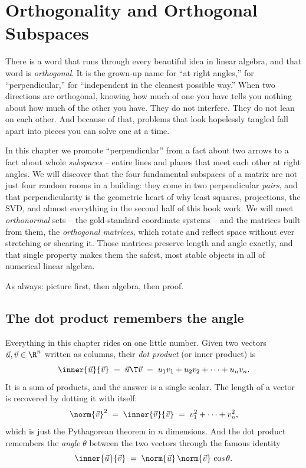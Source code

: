 \chapter{Orthogonality and Orthogonal Subspaces}

There is a word that runs through every beautiful idea in linear algebra, and that word is
\emph{orthogonal}. It is the grown-up name for ``at right angles,'' for ``perpendicular,'' for
``independent in the cleanest possible way.'' When two directions are orthogonal, knowing how
much of one you have tells you nothing about how much of the other you have. They do not
interfere. They do not lean on each other. And because of that, problems that look hopelessly
tangled fall apart into pieces you can solve one at a time.

In this chapter we promote ``perpendicular'' from a fact about two arrows to a fact about whole
\emph{subspaces} -- entire lines and planes that meet each other at right angles. We will discover
that the four fundamental subspaces of a matrix are not just four random rooms in a building:
they come in two perpendicular \emph{pairs}, and that perpendicularity is the geometric heart of
why least squares, projections, the SVD, and almost everything in the second half of this book
work. We will meet \emph{orthonormal} sets -- the gold-standard coordinate systems -- and the
matrices built from them, the \emph{orthogonal matrices}, which rotate and reflect space without
ever stretching or shearing it. Those matrices preserve length and angle exactly, and that single
property makes them the safest, most stable objects in all of numerical linear algebra.

As always: picture first, then algebra, then proof.

\section{The dot product remembers the angle}

Everything in this chapter rides on one little number. Given two vectors
$\vec{u},\vec{v}\in\R^n$ written as columns, their \emph{dot product} (or inner product) is
\[
  \inner{\vec{u}}{\vec{v}} \;=\; \vec{u}\T\vec{v}
  \;=\; u_1 v_1 + u_2 v_2 + \cdots + u_n v_n.
\]
It is a sum of products, and the answer is a single scalar. The length of a vector is recovered
by dotting it with itself:
\[
  \norm{\vec{v}}^2 \;=\; \inner{\vec{v}}{\vec{v}} \;=\; v_1^2 + \cdots + v_n^2,
\]
which is just the Pythagorean theorem in $n$ dimensions. And the dot product remembers the
\emph{angle} $\theta$ between the two vectors through the famous identity
\[
  \inner{\vec{u}}{\vec{v}} \;=\; \norm{\vec{u}}\,\norm{\vec{v}}\,\cos\theta.
\]


